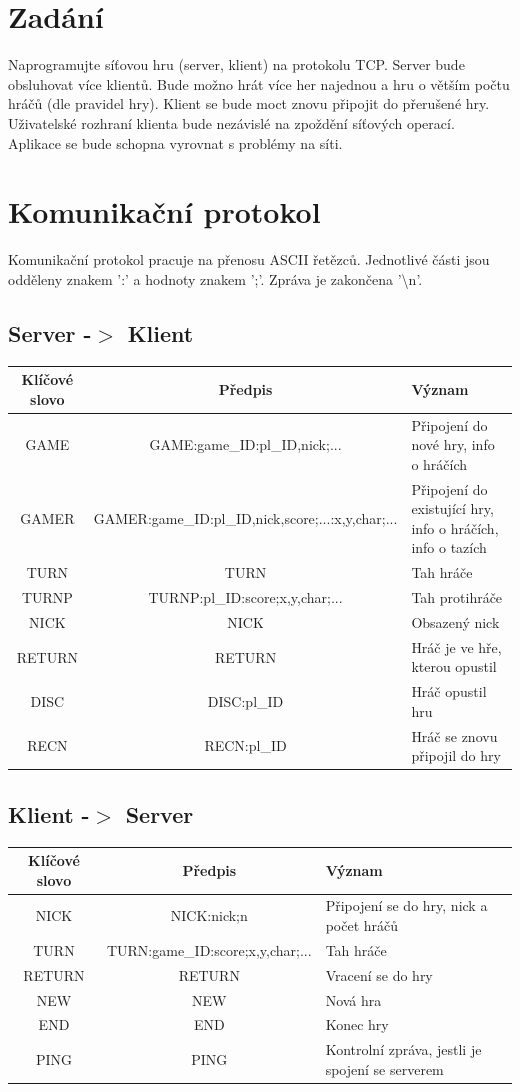 \setlength{\parskip}{1em}

\chapter{Zadání}
Naprogramujte síťovou hru (server, klient) na protokolu TCP. Server bude obsluhovat více klientů. Bude možno hrát více her najednou a hru o větším počtu hráčů (dle pravidel hry). Klient se bude moct znovu připojit do přerušené hry. Uživatelské rozhraní klienta bude nezávislé na zpoždění síťových operací. Aplikace se bude schopna vyrovnat s problémy na síti.


\chapter{Komunikační protokol}
Komunikační protokol pracuje na přenosu ASCII řetězců. Jednotlivé části jsou odděleny znakem ':' a hodnoty znakem ';'. Zpráva je zakončena '\textbackslash{n}'.

\section{Server -$>$ Klient}
\begin{tabular}{|c|c|p{3cm}|}
\hline
Klíčové slovo & Předpis & Význam \\ \hline
GAME	& GAME:game\_ID:pl\_ID,nick;...	& Připojení do nové hry, info o hráčích \\ \hline
GAMER	& GAMER:game\_ID:pl\_ID,nick,score;...:x,y,char;...	& Připojení do existující hry, info o hráčích, info o tazích \\ \hline
TURN	& TURN	& Tah hráče \\ \hline
TURNP	& TURNP:pl\_ID:score;x,y,char;...	& Tah protihráče \\ \hline
NICK	& NICK	& Obsazený nick \\ \hline
RETURN& RETURN	& Hráč je ve hře, kterou opustil \\ \hline
DISC	& DISC:pl\_ID	& Hráč opustil hru \\ \hline
RECN	& RECN:pl\_ID	& Hráč se znovu připojil do hry \\ \hline
\end{tabular}

\section{Klient -$>$ Server}
\begin{tabular}{|c|c|p{5cm}|}
\hline
Klíčové slovo & Předpis & Význam \\ \hline
NICK	& NICK:nick;n	& Připojení se do hry, nick a počet hráčů \\ \hline
TURN	& TURN:game\_ID:score;x,y,char;...	& Tah hráče \\ \hline
RETURN& RETURN 	& Vracení se do hry \\ \hline
NEW		& NEW	& Nová hra \\ \hline
END		& END	& Konec hry \\ \hline
PING	& PING	& Kontrolní zpráva, jestli je spojení se serverem \\ \hline
\end{tabular}



